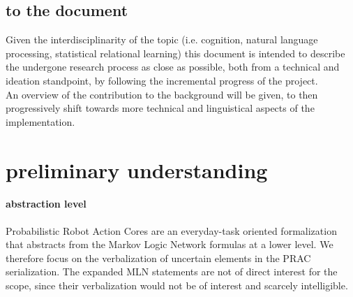 \documentclass[10pt,a4paper]{article}
\begin{document}
\subsection{to the document}
Given the interdisciplinarity of the topic (i.e. cognition, natural language processing, statistical relational learning) this document is intended to describe the undergone research process as close as possible, both from a technical and ideation standpoint, by following the incremental progress of the project.\\
An overview of the contribution to the background will be given, to then progressively shift towards more technical and linguistical aspects of the implementation.




\section{preliminary understanding}
\paragraph{abstraction level}
Probabilistic Robot Action Cores are an everyday-task oriented formalization that abstracts from the Markov Logic Network formulas at a lower level.
We therefore focus on the verbalization of uncertain elements in the PRAC serialization. The expanded MLN statements are not of direct interest for the scope, since their verbalization
would not be of interest and scarcely intelligible.

\end{document}
